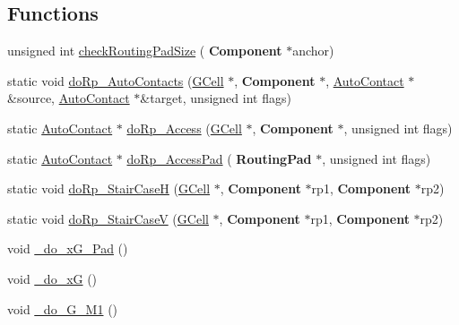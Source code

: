 \subsection*{Functions}
\begin{DoxyCompactItemize}
\item 
unsigned int \mbox{\hyperlink{group__LoadGlobalRouting_gaad5d32b07d1d53ecc8642e4b10df9605}{check\+Routing\+Pad\+Size}} (\textbf{ Component} $\ast$anchor)
\item 
static void \mbox{\hyperlink{group__LoadGlobalRouting_gae9cae408ea16a3f7c77c3d75f0242f19}{do\+Rp\+\_\+\+Auto\+Contacts}} (\mbox{\hyperlink{classKatabatic_1_1GCell}{G\+Cell}} $\ast$, \textbf{ Component} $\ast$, \mbox{\hyperlink{classKatabatic_1_1AutoContact}{Auto\+Contact}} $\ast$\&source, \mbox{\hyperlink{classKatabatic_1_1AutoContact}{Auto\+Contact}} $\ast$\&target, unsigned int flags)
\item 
static \mbox{\hyperlink{classKatabatic_1_1AutoContact}{Auto\+Contact}} $\ast$ \mbox{\hyperlink{group__LoadGlobalRouting_gada6d3c694b8d741b6504b7c3da166357}{do\+Rp\+\_\+\+Access}} (\mbox{\hyperlink{classKatabatic_1_1GCell}{G\+Cell}} $\ast$, \textbf{ Component} $\ast$, unsigned int flags)
\item 
static \mbox{\hyperlink{classKatabatic_1_1AutoContact}{Auto\+Contact}} $\ast$ \mbox{\hyperlink{group__LoadGlobalRouting_ga60edeea78b56db072fc26a58a7afbcd4}{do\+Rp\+\_\+\+Access\+Pad}} (\textbf{ Routing\+Pad} $\ast$, unsigned int flags)
\item 
static void \mbox{\hyperlink{group__LoadGlobalRouting_ga3291d84592215974fe4052c00304bdb1}{do\+Rp\+\_\+\+Stair\+CaseH}} (\mbox{\hyperlink{classKatabatic_1_1GCell}{G\+Cell}} $\ast$, \textbf{ Component} $\ast$rp1, \textbf{ Component} $\ast$rp2)
\item 
static void \mbox{\hyperlink{group__LoadGlobalRouting_ga6361fb0e90f35cd59063a1ee971ef2a9}{do\+Rp\+\_\+\+Stair\+CaseV}} (\mbox{\hyperlink{classKatabatic_1_1GCell}{G\+Cell}} $\ast$, \textbf{ Component} $\ast$rp1, \textbf{ Component} $\ast$rp2)
\item 
void \mbox{\hyperlink{group__LoadGlobalRouting_gabe00ab10a0dab8a3d2de0709e61e4e7d}{\+\_\+do\+\_\+x\+G\+\_\+Pad}} ()
\item 
void \mbox{\hyperlink{group__LoadGlobalRouting_gaaa6d4ccd2eadfb6bc3e2cc98cfaf2cca}{\+\_\+do\+\_\+xG}} ()
\item 
void \mbox{\hyperlink{group__LoadGlobalRouting_gad24a03e87e269f16dcc28d8c2d9f1cfb}{\+\_\+do\+\_\+G\+\_\+M1}} ()
\item 

\end{DoxyCompactItemize}
